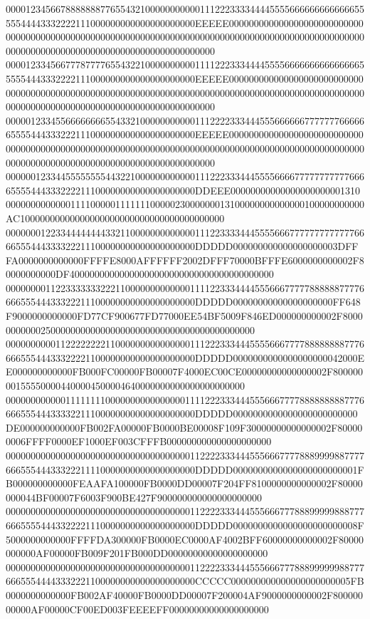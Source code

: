 00001234566788888887765543210000000000011122233334444555566666666666665555544443332222111000000000000000000000EEEEE000000000000000000000000000000000000000000000000000000000000000000000000000000000000000000000000000000000000000000000000000000000000000000000
00001233456677787777655432210000000000111122233344445555666666666666666555554443332222111000000000000000000000EEEEE000000000000000000000000000000000000000000000000000000000000000000000000000000000000000000000000000000000000000000000000000000000000000000000
00000123345566666666554332100000000000111222233344455566666677777776666665555444333222111000000000000000000000EEEEE000000000000000000000000000000000000000000000000000000000000000000000000000000000000000000000000000000000000000000000000000000000000000000000
00000012334455555555443221000000000000111222333444555566667777777777766665555444333222211100000000000000000000DDEEE00000000000000000000001310000000000000011110000011111110000023000000013100000000000000100000000000AC10000000000000000000000000000000000000000
00000001223344444444332110000000000000111223333444555566677777777777776666555444333322211100000000000000000000DDDDD000000000000000000003DFFFA0000000000000FFFFE8000AFFFFFF2002DFFF70000BFFFE6000000000002F80000000000DF40000000000000000000000000000000000000000
00000000112233333332221100000000000001111223334444555666777778888887777666655544433322211100000000000000000000DDDDD00000000000000000000FF648F9000000000000FD77CF900677FD77000EE54BF5009F846ED000000000002F800000000002500000000000000000000000000000000000000000
00000000001122222222110000000000000001112223334445555666777788888888777666655544433322221100000000000000000000DDDDD0000000000000000000042000EE000000000000FB000FC00000FB00007F4000EC00CE00000000000000002F800000001555500004400004500004640000000000000000000000
00000000000011111111000000000000000011112223334445556667777888888888777666655544433332211100000000000000000000DDDDD0000000000000000000000000DE000000000000FB002FA00000FB0000BE00008F109F30000000000000002F800000006FFFF0000EF1000EF003CFFFB000000000000000000000
00000000000000000000000000000000000001122223334445556667777888999988777766655544433322211110000000000000000000DDDDD0000000000000000000000001FB000000000000FEAAFA100000FB0000DD00007F204FF8100000000000002F80000000044BF00007F6003F900BE427F900000000000000000000
00000000000000000000000000000000000001122223334445556667778889999988877766655554443322221110000000000000000000DDDDD0000000000000000000000008F5000000000000FFFFDA300000FB0000EC0000AF4002BFF60000000000002F80000000000AF00000FB009F201FB000DD00000000000000000000
00000000000000000000000000000000000001122223334445556667778889999998877766655544443332221100000000000000000000CCCCC000000000000000000000005FB0000000000000FB002AF40000FB0000DD00007F200004AF9000000000002F80000000000AF00000CF00ED003FEEEEFF00000000000000000000
